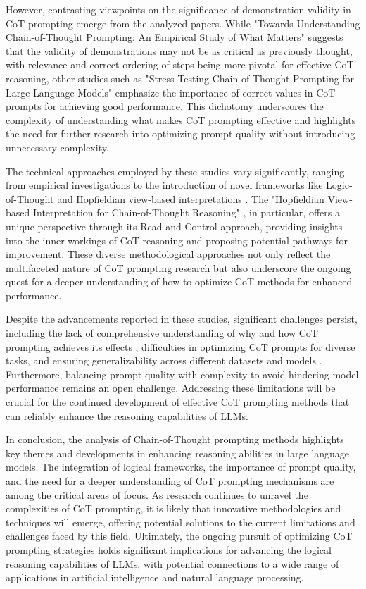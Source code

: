 \documentclass[conference]{IEEEtran}
\begin{document}
However, contrasting viewpoints on the significance of demonstration validity in CoT prompting emerge from the analyzed papers. While "Towards Understanding Chain-of-Thought Prompting: An Empirical Study of What Matters" \cite{b2} suggests that the validity of demonstrations may not be as critical as previously thought, with relevance and correct ordering of steps being more pivotal for effective CoT reasoning, other studies such as "Stress Testing Chain-of-Thought Prompting for Large Language Models" \cite{b4} emphasize the importance of correct values in CoT prompts for achieving good performance. This dichotomy underscores the complexity of understanding what makes CoT prompting effective and highlights the need for further research into optimizing prompt quality without introducing unnecessary complexity.

The technical approaches employed by these studies vary significantly, ranging from empirical investigations \cite{b2, b4} to the introduction of novel frameworks like Logic-of-Thought \cite{b3} and Hopfieldian view-based interpretations \cite{b5}. The "Hopfieldian View-based Interpretation for Chain-of-Thought Reasoning" \cite{b5}, in particular, offers a unique perspective through its Read-and-Control approach, providing insights into the inner workings of CoT reasoning and proposing potential pathways for improvement. These diverse methodological approaches not only reflect the multifaceted nature of CoT prompting research but also underscore the ongoing quest for a deeper understanding of how to optimize CoT methods for enhanced performance.

Despite the advancements reported in these studies, significant challenges persist, including the lack of comprehensive understanding of why and how CoT prompting achieves its effects \cite{b1}, difficulties in optimizing CoT prompts for diverse tasks, and ensuring generalizability across different datasets and models \cite{b2, b4}. Furthermore, balancing prompt quality with complexity to avoid hindering model performance remains an open challenge. Addressing these limitations will be crucial for the continued development of effective CoT prompting methods that can reliably enhance the reasoning capabilities of LLMs.

In conclusion, the analysis of Chain-of-Thought prompting methods highlights key themes and developments in enhancing reasoning abilities in large language models. The integration of logical frameworks, the importance of prompt quality, and the need for a deeper understanding of CoT prompting mechanisms are among the critical areas of focus. As research continues to unravel the complexities of CoT prompting, it is likely that innovative methodologies and techniques will emerge, offering potential solutions to the current limitations and challenges faced by this field. Ultimately, the ongoing pursuit of optimizing CoT prompting strategies holds significant implications for advancing the logical reasoning capabilities of LLMs, with potential connections to a wide range of applications in artificial intelligence and natural language processing.
\end{document}
